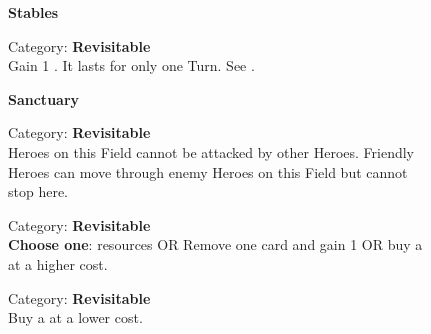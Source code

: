 \begin{figure}[H]
  \begin{minipage}[t]{0.47\textwidth}
    \vspace{0pt}
    \centering
    \phantom{j}\textbf{Stables}\phantom{j}\par
    \caption{\small Category: \textbf{Revisitable}\\
      Gain 1 .
      It lasts for only one Turn.
      See \protect{}.
    }
  \end{minipage}\hfill
  \begin{minipage}[t]{0.47\textwidth}
    \vspace{0pt}
    \centering
    \textbf{Sanctuary}\par
    \caption{\small Category: \textbf{Revisitable}\\
      Heroes on this Field cannot be attacked by other Heroes.
      Friendly Heroes can move through enemy Heroes on this Field but cannot stop here.}
  \end{minipage}
\end{figure}

\begin{figure}[H]
  \begin{minipage}[t]{0.47\textwidth}
    \vspace{0pt}
    \centering
    \par
    \caption{\small Category: \textbf{Revisitable}\\
      \textbf{Choose one}: \protect{} resources OR Remove one card and gain 1  OR buy a \protect{} at a higher cost.
    }
  \end{minipage}\hfill
  \begin{minipage}[t]{0.47\textwidth}
    \vspace{0pt}
    \centering
    \phantom{j}\par
    \caption{\small Category: \textbf{Revisitable}\\Buy a \protect{} at a lower cost.\phantom{.......}}
  \end{minipage}
\end{figure}

